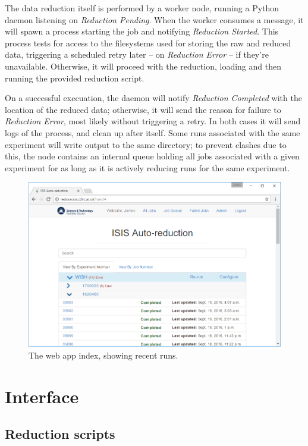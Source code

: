 \documentclass[twocolumn]{article}
\begin{document}
The data reduction itself is performed by a worker node, running a
Python daemon listening on \emph{Reduction Pending}. When the worker
consumes a message, it will spawn a process starting the job and
notifying \emph{Reduction Started}. This process tests for access to the
filesystems used for storing the raw and reduced data, triggering a
scheduled retry later -- on \emph{Reduction Error} -- if they're
unavailable. Otherwise, it will proceed with the reduction, loading and
then running the provided reduction script.

On a successful execuation, the daemon will notify \emph{Reduction Completed} with
the location of the reduced data; otherwise, it will send the reason for
failure to \emph{Reduction Error}, most likely without triggering a
retry. In both cases it will send logs of the process, and clean up
after itself. Some runs associated with the same experiment will write
output to the same directory; to prevent clashes due to this, the node
contains an internal queue holding all jobs associated with a given
experiment for as long as it is actively reducing runs for the
same experiment.


\begin{figure}
\centering\includegraphics[width=0.8\linewidth]{index.png}
\caption{The web app index, showing recent runs.}
\end{figure}

\section{Interface}\label{interface}

\subsection{Reduction scripts}\label{reduction-scripts}
\end{document}
